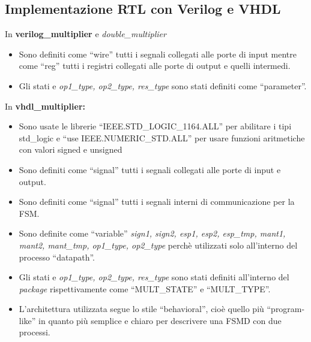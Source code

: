 \documentclass[]{IEEEtran}
\begin{document}
\subsection{Implementazione RTL con Verilog e VHDL}
In \textbf{verilog\_multiplier} e \textit{double\_multiplier}
\begin{itemize}
    \item Sono definiti come ``wire'' tutti i segnali collegati alle porte di input mentre come ``reg'' tutti i registri collegati alle porte di output e quelli intermedi.
    \item Gli stati e \textit{op1\_type, op2\_type, res\_type} sono stati definiti come ``parameter''.
\end{itemize}
In \textbf{vhdl\_multiplier:}
\begin{itemize}
    \item Sono usate le librerie ``IEEE.STD\_LOGIC\_1164.ALL'' per abilitare i tipi std\_logic e ``use IEEE.NUMERIC\_STD.ALL'' per usare funzioni aritmetiche con valori signed e unsigned
    \item Sono definiti come ``signal'' tutti i segnali collegati alle porte di input e output.
    \item Sono definiti come ``signal'' tutti i segnali interni di communicazione per la FSM.
    \item Sono definite come ``variable'' \textit{sign1, sign2, esp1, esp2, esp\_tmp, mant1, mant2, mant\_tmp, op1\_type, op2\_type} perchè utilizzati solo all'interno del processo ``datapath''.
    \item Gli stati e \textit{op1\_type, op2\_type, res\_type} sono stati definiti all'interno del \textit{package} rispettivamente come ``MULT\_STATE'' e ``MULT\_TYPE''.
    \item L'architettura utilizzata segue lo stile ``behavioral'', cioè quello più ``program-like'' in quanto più semplice e chiaro per descrivere una FSMD con due processi.
\end{itemize}
\end{document}

